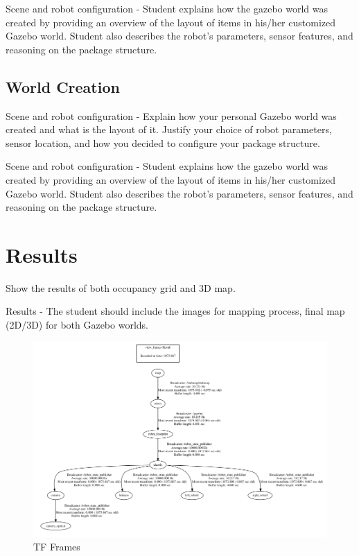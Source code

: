 \documentclass[10pt,journal,compsoc]{IEEEtran}
\begin{document}
Scene and robot configuration - Student explains how the gazebo world was created by providing an overview of the layout of items in his/her customized Gazebo world. Student also describes the robot's parameters, sensor features, and reasoning on the package structure.

\subsection{World Creation}
Scene and robot configuration - Explain how your personal Gazebo world was created and what is the layout of it. Justify your choice of robot parameters, sensor location, and how you decided to configure your package structure.

Scene and robot configuration - Student explains how the gazebo world was created by providing an overview of the layout of items in his/her customized Gazebo world. Student also describes the robot's parameters, sensor features, and reasoning on the package structure.

\section{Results}
Show the results of both occupancy grid and 3D map.

Results - The student should include the images for mapping process, final map (2D/3D) for both Gazebo worlds.

\begin{figure}[thpb]
    \centering
    \includegraphics[width=\linewidth]{frames}
    \caption{TF Frames}
    \label{fig:frames}
\end{figure}
\end{document}
